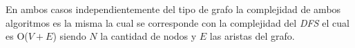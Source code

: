 En ambos casos independientemente del tipo de grafo la complejidad de ambos algoritmos es la misma la cual se corresponde con la complejidad del \emph{DFS} el cual es O($V+E$) siendo $N$ la cantidad de nodos y $E$ las aristas del grafo. 